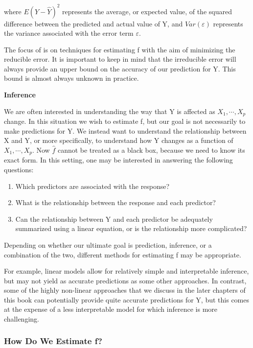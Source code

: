 \documentclass{article}
\theoremstyle{definition}
\theoremstyle{remark}
\begin{document}
where $E(Y-\hat{Y})^2$ represents the average, or expected value, of the squared difference between the predicted and actual value of Y, and $Var(\varepsilon)$ represents
the variance associated with the error term $\varepsilon$.

The focus of is on techniques for estimating f with the aim of
minimizing the reducible error. It is important to keep in mind that the
irreducible error will always provide an upper bound on the accuracy of
our prediction for Y. This bound is almost always unknown in practice.

\hspace{\fill}

\noindent\textbf{Inference}

We are often interested in understanding the way that Y is affected as
$X_1,\cdots,X_p $ change. In this situation we wish to estimate f, but our goal is not necessarily to make predictions for Y. We instead want to understand the relationship between X and Y, or more specifically, to understand how Y changes as a function of $X_1,\cdots,X_p $. Now $\hat{f}$ cannot be treated as a black box, because we need to know its exact form. In this setting, one may be interested in answering the following questions:

\begin{enumerate}
	\item Which predictors are associated with the response?
	\item What is the relationship between the response and each predictor?
	\item Can the relationship between Y and each predictor be adequately summarized using a linear equation, or is the relationship more complicated?
\end{enumerate}

Depending on whether our ultimate goal is prediction, inference, or a combination of the two, different methods for estimating f may be appropriate.

For example, linear models allow for relatively simple and interpretable inference, but may not yield as accurate predictions as some other
approaches. In contrast, some of the highly non-linear approaches that we
discuss in the later chapters of this book can potentially provide quite accurate
predictions for Y, but this comes at the expense of a less interpretable
model for which inference is more challenging.

\subsubsection*{How Do We Estimate f?}
\end{document}
